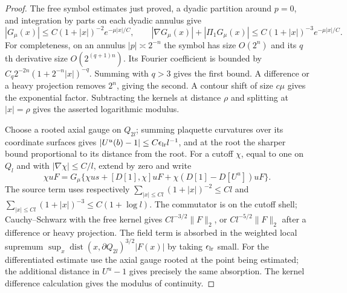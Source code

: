 \documentclass[11pt,letterpaper,reqno]{amsart}
\theoremstyle{definition}
\theoremstyle{remark}
\begin{document}
\begin{proof}
The free symbol estimates just proved, a dyadic partition around
$p=0$, and integration by parts on each dyadic annulus give
\[
 |G_\mu(x)|\le C(1+|x|)^{-2}e^{-\mu|x|/C},\qquad
 |\nabla G_\mu(x)|+|\Pi_1G_\mu(x)|
       \le C(1+|x|)^{-3}e^{-\mu|x|/C}.
\]
For completeness, on an annulus $|p|\asymp2^{-n}$ the symbol
has size $O(2^n)$ and its $q$th derivative size $O(2^{(q+1)n})$.
Its Fourier coefficient is bounded by
$C_q2^{-2n}(1+2^{-n}|x|)^{-q}$.  Summing with $q>3$ gives the
first bound.  A difference or a heavy projection removes $2^n$,
giving the second.  A contour shift of size $c\mu$ gives the
exponential factor.  Subtracting the kernels at distance $\rho$
and splitting at $|x|=\rho$ gives the asserted logarithmic modulus.

Choose a rooted axial gauge on $Q_{2l}$; summing plaquette
curvatures over its coordinate surfaces gives
$|U^u(b)-1|\le C\epsilon_{\rm lr}l^{-1}$, and at the root
the sharper bound proportional to its distance from the root.
For a cutoff $\chi$, equal to one on $Q_l$ and with
$|\nabla\chi|\le C/l$, extend by zero and write
\[
 \chi uF=G_\mu\{\chi us+[D[1],\chi]uF+
                 \chi(D[1]-D[U^u])uF\}.
\]
The source term uses respectively
$\sum_{|x|\le Cl}(1+|x|)^{-2}\le Cl$ and
$\sum_{|x|\le Cl}(1+|x|)^{-3}\le C(1+\log l)$.
The commutator is on the cutoff shell; Cauchy--Schwarz with the
free kernel gives $Cl^{-3/2}\|F\|_2$, or
$Cl^{-5/2}\|F\|_2$ after a difference or heavy projection.
The field term is absorbed in the weighted local supremum
$\sup_x\operatorname{dist}(x,\partial Q_{2l})^{3/2}|F(x)|$
by taking $\epsilon_{\rm lr}$ small.  For the differentiated
estimate use the axial gauge rooted at the point being estimated;
the additional distance in $U^u-1$ gives precisely the same
absorption.  The kernel difference calculation gives the modulus
of continuity.  
\end{proof}
\end{document}
